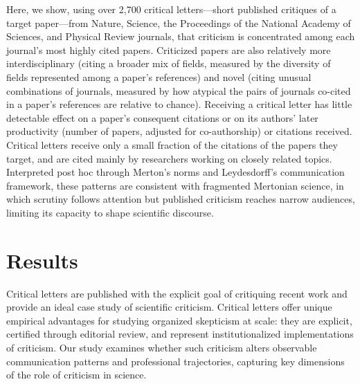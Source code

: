 \documentclass[12pt,a4paper]{article}
\numberwithin{equation}{section}
\begin{document}
Here, we show, using over 2,700 critical letters---short published critiques of a target paper---from Nature, Science, the Proceedings of the National Academy of Sciences, and Physical Review journals, that criticism is concentrated among each journal's most highly cited papers.
Criticized papers are also relatively more interdisciplinary (citing a broader mix of fields, measured by the diversity of fields represented among a paper's references) and novel (citing unusual combinations of journals, measured by how atypical the pairs of journals co-cited in a paper's references are relative to chance).
Receiving a critical letter has little detectable effect on a paper's consequent citations or on its authors' later productivity (number of papers, adjusted for co-authorship) or citations received.
Critical letters receive only a small fraction of the citations of the papers they target, and are cited mainly by researchers working on closely related topics.
Interpreted post hoc through Merton's norms and Leydesdorff's communication framework, these patterns are consistent with fragmented Mertonian science, in which scrutiny follows attention but published criticism reaches narrow audiences, limiting its capacity to shape scientific discourse.



%
%
\section*{Results}
Critical letters are published with the explicit goal of critiquing recent work and provide an ideal case study of scientific criticism.
Critical letters offer unique empirical advantages for studying organized skepticism at scale: they are explicit, certified through editorial review, and represent institutionalized implementations of criticism.
Our study examines whether such criticism alters observable communication patterns and professional trajectories, capturing key dimensions of the role of criticism in science.
\end{document}
